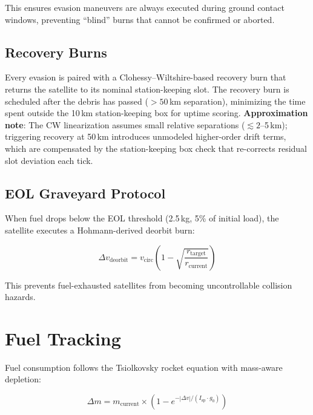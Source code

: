 \documentclass[11pt,a4paper]{article}
\begin{document}
This ensures evasion maneuvers are always executed during ground contact
windows, preventing ``blind'' burns that cannot be confirmed or aborted.

\subsection{Recovery Burns}

Every evasion is paired with a Clohessy--Wiltshire-based recovery burn that
returns the satellite to its nominal station-keeping slot. The recovery burn is
scheduled after the debris has passed ($> 50$\,km separation), minimizing the
time spent outside the 10\,km station-keeping box for uptime scoring.
\textbf{Approximation note}: The CW linearization assumes small relative
separations ($\lesssim 2$--5\,km); triggering recovery at 50\,km introduces
unmodeled higher-order drift terms, which are compensated by the
station-keeping box check that re-corrects residual slot deviation each tick.

\subsection{EOL Graveyard Protocol}

When fuel drops below the EOL threshold (2.5\,kg, 5\% of initial load), the
satellite executes a Hohmann-derived deorbit burn:

\begin{equation}
\Delta v_\text{deorbit} = v_\text{circ} \left(1 - \sqrt{\frac{r_\text{target}}{r_\text{current}}}\right)
\end{equation}

This prevents fuel-exhausted satellites from becoming uncontrollable collision
hazards.

\section{Fuel Tracking}

Fuel consumption follows the Tsiolkovsky rocket equation with mass-aware
depletion:

\begin{equation}
\Delta m = m_\text{current} \times \left(1 - e^{-|\Delta v| / (I_\text{sp} \cdot g_0)}\right)
\end{equation}
\end{document}
